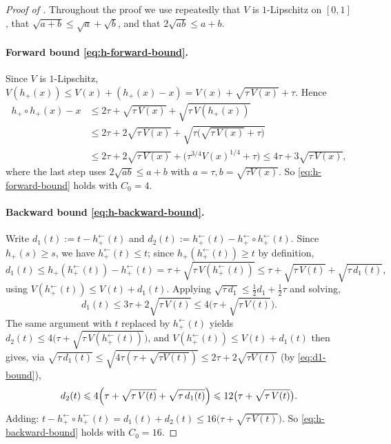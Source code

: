 \documentclass[english]{article}
\theoremstyle{plain}
\theoremstyle{definition}
\newcommand{\hinv}{h_+^{\leftarrow}}
\newcommand{\hupup}{h_+\mathbin{\circ}h_+}                 %
\newcommand{\hinvinv}{h_+^{\leftarrow}\mathbin{\circ}h_+^{\leftarrow}}  %
\newcommand{\mgn}[1]{\tau+\sqrt{\tau\,V(#1)}}
\begin{document}
\begin{proof}[Proof of ]
Throughout the proof we use repeatedly that $V$ is $1$-Lipschitz on $[0,1]$, that $\sqrt{a+b}\leqslant\sqrt a+\sqrt b$, and that $2\sqrt{ab}\leqslant a+b$.

\paragraph{Forward bound \eqref{eq:h-forward-bound}.} Since $V$ is $1$-Lipschitz,
$V(h_+(x))\leqslant V(x)+(h_+(x)-x)=V(x)+\sqrt{\tau\,V(x)}+\tau$. Hence
\begin{align*}
\hupup(x)-x
&\leqslant 2\tau+\sqrt{\tau\,V(x)}+\sqrt{\tau\,V(h_+(x))}\\
&\leqslant 2\tau+2\sqrt{\tau\,V(x)}+\sqrt{\tau\bigl(\sqrt{\tau\,V(x)}+\tau\bigr)}\\
&\leqslant 2\tau+2\sqrt{\tau\,V(x)}+\bigl(\tau^{3/4}V(x)^{1/4}+\tau\bigr)
\leqslant 4\tau+3\sqrt{\tau\,V(x)},
\end{align*}
where the last step uses $2\sqrt{ab}\leqslant a+b$ with $a=\tau,b=\sqrt{\tau V(x)}$. So \eqref{eq:h-forward-bound} holds with $C_0=4$.

\paragraph{Backward bound \eqref{eq:h-backward-bound}.} Write
$d_1(t):=t-\hinv(t)$ and $d_2(t):=\hinv(t)-\hinvinv(t)$.
Since $h_+(s)\geqslant s$, we have $\hinv(t)\leqslant t$; since $h_+(\hinv(t))\geqslant t$ by definition,
\[
d_1(t)\leqslant h_+(\hinv(t))-\hinv(t)=\tau+\sqrt{\tau\,V(\hinv(t))}\leqslant \tau+\sqrt{\tau\,V(t)}+\sqrt{\tau\,d_1(t)},
\]
using $V(\hinv(t))\leqslant V(t)+d_1(t)$. Applying $\sqrt{\tau\,d_1}\leqslant\tfrac12 d_1+\tfrac12\tau$ and solving,
\begin{equation}
d_1(t)\leqslant 3\tau+2\sqrt{\tau\,V(t)}\leqslant 4\bigl(\mgn{t}\bigr).
\label{eq:d1-bound}
\end{equation}
The same argument with $t$ replaced by $\hinv(t)$ yields $d_2(t)\leqslant 4\bigl(\mgn{\hinv(t)}\bigr)$, and $V(\hinv(t))\leqslant V(t)+d_1(t)$ then gives, via $\sqrt{\tau\,d_1(t)}\leqslant\sqrt{4\tau(\tau+\sqrt{\tau V(t)})}\leqslant 2\tau+2\sqrt{\tau V(t)}$ (by \eqref{eq:d1-bound}),
\[
d_2(t)\leqslant 4\Bigl(\tau+\sqrt{\tau\,V(t)}+\sqrt{\tau\,d_1(t)}\Bigr)\leqslant 12\bigl(\mgn{t}\bigr).
\]
Adding: $t-\hinvinv(t)=d_1(t)+d_2(t)\leqslant 16\bigl(\mgn{t}\bigr)$. So \eqref{eq:h-backward-bound} holds with $C_0=16$.
\end{proof}
\end{document}
